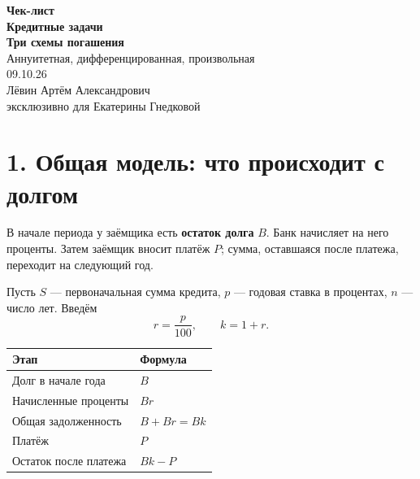 \documentclass[a4paper,12pt]{article}
\newcommand{\key}[1]{\textcolor{darkaccent}{\textbf{#1}}}
\begin{document}
\thispagestyle{empty}
\begin{center}
\vspace*{31mm}
{\Large\textcolor{accent}{\textbf{Чек-лист}}}\\[9mm]
{\Huge\textbf{Кредитные задачи}}\\[6mm]
{\Large\textbf{Три схемы погашения}}\\[6mm]
{\large Аннуитетная, дифференцированная, произвольная}\\[19mm]
{\large 09.10.26}\\[31mm]
{\large Лёвин Артём Александрович}\\[3mm]
{\large\textcolor{darkaccent}{эксклюзивно для Екатерины Гнедковой}}
\end{center}
\vfill
\begin{center}
\end{center}
\clearpage

\section*{1. Общая модель: что происходит с долгом}

В начале периода у заёмщика есть \key{остаток долга} $B$. Банк начисляет на него проценты. Затем заёмщик вносит платёж $P$; сумма, оставшаяся после платежа, переходит на следующий год.

Пусть $S$ --- первоначальная сумма кредита, $p$ --- годовая ставка в процентах, $n$ --- число лет. Введём
\[
 r=\frac{p}{100},\qquad k=1+r.
\]

\begin{center}
\renewcommand{\arraystretch}{1.24}
\begin{tabularx}{\linewidth}{@{}>{\raggedright\arraybackslash}X >{\raggedright\arraybackslash}X@{}}
\toprule
Этап & Формула \\
\midrule
Долг в начале года & $B$ \\
Начисленные проценты & $Br$ \\
Общая задолженность & $B+Br=Bk$ \\
Платёж & $P$ \\
Остаток после платежа & $Bk-P$ \\
\bottomrule
\end{tabularx}
\end{center}
\end{document}
